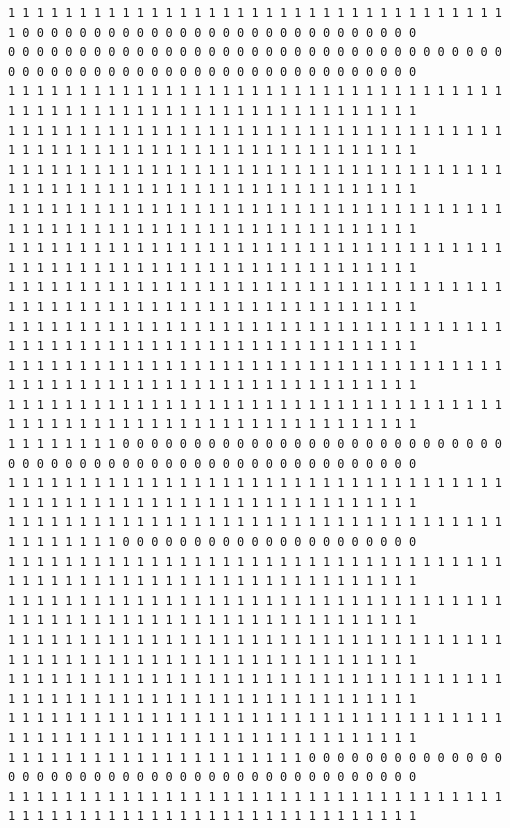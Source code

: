 \documentclass [10 pt, a4 paper]{report}
\begin{document}
\begin{lstlisting}[caption=Output of the simulation once it is finished, label={lst:code1}, frame=single]
1 1 1 1 1 1 1 1 1 1 1 1 1 1 1 1 1 1 1 1 1 1 1 1 1 1 1 1 1 1 1 1 1 1 1 1 0 0 0 0 0 0 0 0 0 0 0 0 0 0 0 0 0 0 0 0 0 0 0 0 0 0 0 0
0 0 0 0 0 0 0 0 0 0 0 0 0 0 0 0 0 0 0 0 0 0 0 0 0 0 0 0 0 0 0 0 0 0 0 0 0 0 0 0 0 0 0 0 0 0 0 0 0 0 0 0 0 0 0 0 0 0 0 0 0 0 0 0
1 1 1 1 1 1 1 1 1 1 1 1 1 1 1 1 1 1 1 1 1 1 1 1 1 1 1 1 1 1 1 1 1 1 1 1 1 1 1 1 1 1 1 1 1 1 1 1 1 1 1 1 1 1 1 1 1 1 1 1 1 1 1 1
1 1 1 1 1 1 1 1 1 1 1 1 1 1 1 1 1 1 1 1 1 1 1 1 1 1 1 1 1 1 1 1 1 1 1 1 1 1 1 1 1 1 1 1 1 1 1 1 1 1 1 1 1 1 1 1 1 1 1 1 1 1 1 1
1 1 1 1 1 1 1 1 1 1 1 1 1 1 1 1 1 1 1 1 1 1 1 1 1 1 1 1 1 1 1 1 1 1 1 1 1 1 1 1 1 1 1 1 1 1 1 1 1 1 1 1 1 1 1 1 1 1 1 1 1 1 1 1
1 1 1 1 1 1 1 1 1 1 1 1 1 1 1 1 1 1 1 1 1 1 1 1 1 1 1 1 1 1 1 1 1 1 1 1 1 1 1 1 1 1 1 1 1 1 1 1 1 1 1 1 1 1 1 1 1 1 1 1 1 1 1 1
1 1 1 1 1 1 1 1 1 1 1 1 1 1 1 1 1 1 1 1 1 1 1 1 1 1 1 1 1 1 1 1 1 1 1 1 1 1 1 1 1 1 1 1 1 1 1 1 1 1 1 1 1 1 1 1 1 1 1 1 1 1 1 1
1 1 1 1 1 1 1 1 1 1 1 1 1 1 1 1 1 1 1 1 1 1 1 1 1 1 1 1 1 1 1 1 1 1 1 1 1 1 1 1 1 1 1 1 1 1 1 1 1 1 1 1 1 1 1 1 1 1 1 1 1 1 1 1
1 1 1 1 1 1 1 1 1 1 1 1 1 1 1 1 1 1 1 1 1 1 1 1 1 1 1 1 1 1 1 1 1 1 1 1 1 1 1 1 1 1 1 1 1 1 1 1 1 1 1 1 1 1 1 1 1 1 1 1 1 1 1 1
1 1 1 1 1 1 1 1 1 1 1 1 1 1 1 1 1 1 1 1 1 1 1 1 1 1 1 1 1 1 1 1 1 1 1 1 1 1 1 1 1 1 1 1 1 1 1 1 1 1 1 1 1 1 1 1 1 1 1 1 1 1 1 1
1 1 1 1 1 1 1 1 1 1 1 1 1 1 1 1 1 1 1 1 1 1 1 1 1 1 1 1 1 1 1 1 1 1 1 1 1 1 1 1 1 1 1 1 1 1 1 1 1 1 1 1 1 1 1 1 1 1 1 1 1 1 1 1
1 1 1 1 1 1 1 1 0 0 0 0 0 0 0 0 0 0 0 0 0 0 0 0 0 0 0 0 0 0 0 0 0 0 0 0 0 0 0 0 0 0 0 0 0 0 0 0 0 0 0 0 0 0 0 0 0 0 0 0 0 0 0 0
1 1 1 1 1 1 1 1 1 1 1 1 1 1 1 1 1 1 1 1 1 1 1 1 1 1 1 1 1 1 1 1 1 1 1 1 1 1 1 1 1 1 1 1 1 1 1 1 1 1 1 1 1 1 1 1 1 1 1 1 1 1 1 1
1 1 1 1 1 1 1 1 1 1 1 1 1 1 1 1 1 1 1 1 1 1 1 1 1 1 1 1 1 1 1 1 1 1 1 1 1 1 1 1 1 1 1 0 0 0 0 0 0 0 0 0 0 0 0 0 0 0 0 0 0 0 0 0
1 1 1 1 1 1 1 1 1 1 1 1 1 1 1 1 1 1 1 1 1 1 1 1 1 1 1 1 1 1 1 1 1 1 1 1 1 1 1 1 1 1 1 1 1 1 1 1 1 1 1 1 1 1 1 1 1 1 1 1 1 1 1 1
1 1 1 1 1 1 1 1 1 1 1 1 1 1 1 1 1 1 1 1 1 1 1 1 1 1 1 1 1 1 1 1 1 1 1 1 1 1 1 1 1 1 1 1 1 1 1 1 1 1 1 1 1 1 1 1 1 1 1 1 1 1 1 1
1 1 1 1 1 1 1 1 1 1 1 1 1 1 1 1 1 1 1 1 1 1 1 1 1 1 1 1 1 1 1 1 1 1 1 1 1 1 1 1 1 1 1 1 1 1 1 1 1 1 1 1 1 1 1 1 1 1 1 1 1 1 1 1
1 1 1 1 1 1 1 1 1 1 1 1 1 1 1 1 1 1 1 1 1 1 1 1 1 1 1 1 1 1 1 1 1 1 1 1 1 1 1 1 1 1 1 1 1 1 1 1 1 1 1 1 1 1 1 1 1 1 1 1 1 1 1 1
1 1 1 1 1 1 1 1 1 1 1 1 1 1 1 1 1 1 1 1 1 1 1 1 1 1 1 1 1 1 1 1 1 1 1 1 1 1 1 1 1 1 1 1 1 1 1 1 1 1 1 1 1 1 1 1 1 1 1 1 1 1 1 1
1 1 1 1 1 1 1 1 1 1 1 1 1 1 1 1 1 1 1 1 1 0 0 0 0 0 0 0 0 0 0 0 0 0 0 0 0 0 0 0 0 0 0 0 0 0 0 0 0 0 0 0 0 0 0 0 0 0 0 0 0 0 0 0
1 1 1 1 1 1 1 1 1 1 1 1 1 1 1 1 1 1 1 1 1 1 1 1 1 1 1 1 1 1 1 1 1 1 1 1 1 1 1 1 1 1 1 1 1 1 1 1 1 1 1 1 1 1 1 1 1 1 1 1 1 1 1 1

\end{lstlisting}
\end{document}
